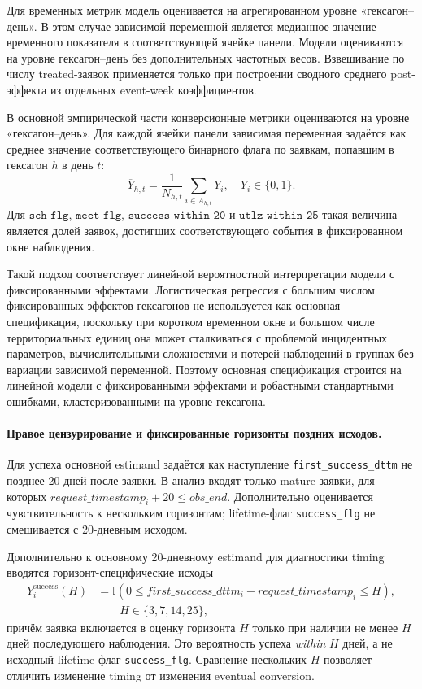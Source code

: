 \documentclass[14pt,a4paper]{extarticle}
\begin{document}
Для временных метрик модель оценивается на агрегированном уровне «гексагон--день». В этом случае зависимой переменной является медианное значение временного показателя в соответствующей ячейке панели. Модели оцениваются на уровне гексагон--день без дополнительных частотных весов. Взвешивание по числу treated-заявок применяется только при построении сводного среднего post-эффекта из отдельных event-week коэффициентов.

В основной эмпирической части конверсионные метрики оцениваются на уровне «гексагон--день». Для каждой ячейки панели зависимая переменная задаётся как среднее значение соответствующего бинарного флага по заявкам, попавшим в гексагон \(h\) в день \(t\):
\[
\overline{Y}_{h,t}
=
\frac{1}{N_{h,t}}
\sum_{i \in A_{h,t}} Y_i,
\quad
Y_i \in \{0,1\}.
\]
Для \(\texttt{sch\_flg}\), \(\texttt{meet\_flg}\), \(\texttt{success\_within\_20}\) и \(\texttt{utlz\_within\_25}\) такая величина является долей заявок, достигших соответствующего события в фиксированном окне наблюдения.

Такой подход соответствует линейной вероятностной интерпретации модели с фиксированными эффектами. Логистическая регрессия с большим числом фиксированных эффектов гексагонов не используется как основная спецификация, поскольку при коротком временном окне и большом числе территориальных единиц она может сталкиваться с проблемой инцидентных параметров, вычислительными сложностями и потерей наблюдений в группах без вариации зависимой переменной. Поэтому основная спецификация строится на линейной модели с фиксированными эффектами и робастными стандартными ошибками, кластеризованными на уровне гексагона.

\paragraph{Правое цензурирование и фиксированные горизонты поздних исходов.}

Для успеха основной estimand задаётся как наступление
\texttt{first\_success\_dttm} не позднее 20 дней после заявки. В анализ входят
только mature-заявки, для которых
\(request\_timestamp_i+20\leq obs\_end\). Дополнительно оценивается
чувствительность к нескольким горизонтам; lifetime-флаг \texttt{success\_flg}
не смешивается с 20-дневным исходом.

Дополнительно к основному 20-дневному estimand для диагностики timing
вводятся горизонт-специфические исходы
\[
\begin{aligned}
Y_i^{\mathrm{success}}(H)
&=
\mathbb{I}\!\left(
0\le first\_success\_dttm_i-request\_timestamp_i\le H
\right),\\
&\qquad H\in\{3,7,14,25\},
\end{aligned}
\]
причём заявка включается в оценку горизонта \(H\) только при наличии не менее
\(H\) дней последующего наблюдения. Это вероятность успеха \emph{within}
\(H\) дней, а не исходный lifetime-флаг \texttt{success\_flg}. Сравнение
нескольких \(H\) позволяет отличить изменение timing от изменения eventual
conversion.
\end{document}
